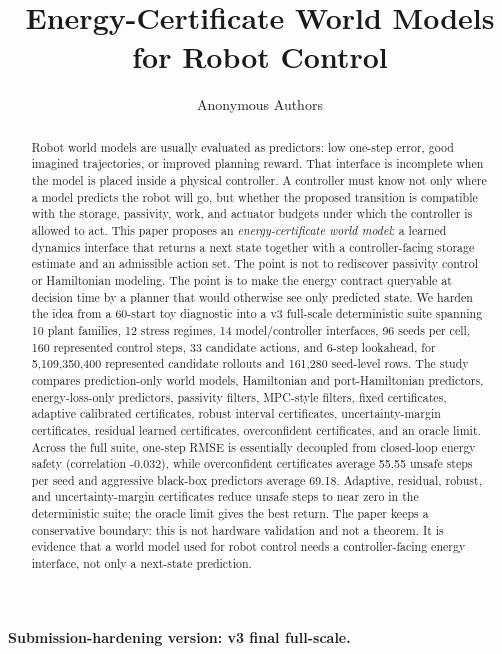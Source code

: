 \documentclass{article}
\title{Energy-Certificate World Models for Robot Control}
\author{Anonymous Authors}
\newcommand{\fullscale}{5,109,350,400}
\newcommand{\seedrows}{161,280}
\begin{document}
\maketitle

\noindent\textbf{Submission-hardening version: v3 final full-scale.}

\begin{abstract}
Robot world models are usually evaluated as predictors: low one-step error, good imagined trajectories, or improved planning reward. That interface is incomplete when the model is placed inside a physical controller. A controller must know not only where a model predicts the robot will go, but whether the proposed transition is compatible with the storage, passivity, work, and actuator budgets under which the controller is allowed to act. This paper proposes an \emph{energy-certificate world model}: a learned dynamics interface that returns a next state together with a controller-facing storage estimate and an admissible action set. The point is not to rediscover passivity control or Hamiltonian modeling. The point is to make the energy contract queryable at decision time by a planner that would otherwise see only predicted state.
We harden the idea from a 60-start toy diagnostic into a v3 full-scale deterministic suite spanning 10 plant families, 12 stress regimes, 14 model/controller interfaces, 96 seeds per cell, 160 represented control steps, 33 candidate actions, and 6-step lookahead, for \fullscale{} represented candidate rollouts and \seedrows{} seed-level rows. The study compares prediction-only world models, Hamiltonian and port-Hamiltonian predictors, energy-loss-only predictors, passivity filters, MPC-style filters, fixed certificates, adaptive calibrated certificates, robust interval certificates, uncertainty-margin certificates, residual learned certificates, overconfident certificates, and an oracle limit. Across the full suite, one-step RMSE is essentially decoupled from closed-loop energy safety (correlation -0.032), while overconfident certificates average 55.55 unsafe steps per seed and aggressive black-box predictors average 69.18. Adaptive, residual, robust, and uncertainty-margin certificates reduce unsafe steps to near zero in the deterministic suite; the oracle limit gives the best return. The paper keeps a conservative boundary: this is not hardware validation and not a theorem. It is evidence that a world model used for robot control needs a controller-facing energy interface, not only a next-state prediction.
\end{abstract}
\end{document}

